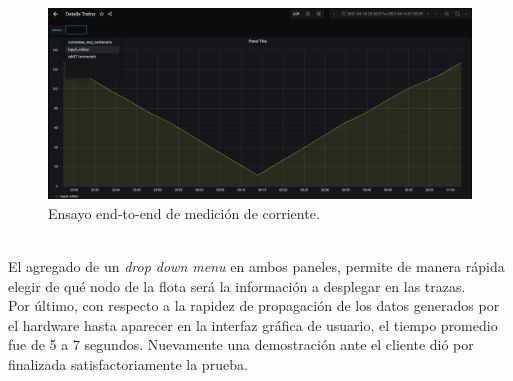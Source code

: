 \begin{figure}[h]
	\centering
	\includegraphics[width=1.0\linewidth]{Figures/captura_historico_dropdown}
	\caption{Ensayo end-to-end de medici\'{o}n de corriente.}
	\label{fig:capturahistoricodropdown}
\end{figure}\\
El agregado de un \textit{drop down menu} en ambos paneles, permite de manera r\'{a}pida elegir de qu\'{e} nodo de la flota será la informaci\'{o}n a desplegar en las trazas.\\
Por \'{u}ltimo, con respecto a la rapidez de propagaci\'{o}n de los datos generados por el hardware hasta aparecer en la interfaz gráfica de usuario, el tiempo promedio fue de 5 a 7 segundos. Nuevamente una demostraci\'{o}n ante el cliente di\'{o} por finalizada satisfactoriamente la prueba.